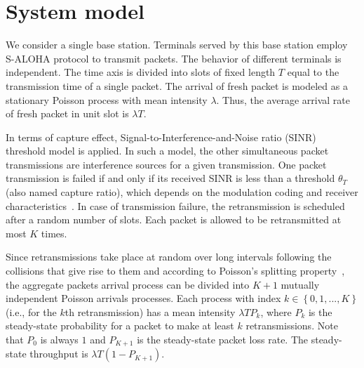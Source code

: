 \section{System model}
\label{sec:icc17-system-model}
We consider a single base station. 
Terminals served by this base station employ S-ALOHA protocol to transmit packets. 
The behavior of different terminals is independent.
The time axis is divided into slots of fixed length $T$ equal to the transmission time of a single packet. 
The arrival of fresh packet is modeled as a stationary Poisson process with mean intensity $\lambda$. 
Thus, the average arrival rate of fresh packet in unit slot is $\lambda T$. 

In terms of capture effect, Signal-to-Interference-and-Noise ratio (SINR) threshold model is applied. 
In such a model, the other simultaneous packet transmissions are interference sources for a given transmission. 
One packet transmission is failed if and only if its received SINR is less than a threshold $\theta_{T}$ (also named capture ratio), which depends on the modulation coding and receiver characteristics~\cite{dardari2000capacity}. 
In case of transmission failure, the retransmission is scheduled after a random number of slots. 
Each packet is allowed to be retransmitted at most $K$ times. 

Since retransmissions take place at random over long intervals following the collisions that give rise to them and according to Poisson's splitting property~\cite{meyn2012markov}, the aggregate packets arrival process can be divided into $K+1$ mutually independent Poisson arrivals processes. Each process with index $k\in \left\lbrace 0,1, ..., K\right\rbrace$ (i.e., for the $k$th retransmission) has a mean intensity $\lambda T P_k$, where $P_k$ is the steady-state probability for a packet to make at least $k$ retransmissions. Note that $P_0$ is always $1$ and $P_{K+1}$ is the steady-state packet loss rate. The steady-state throughput is $\lambda T\left( 1 - P_{K+1}\right)$. 

